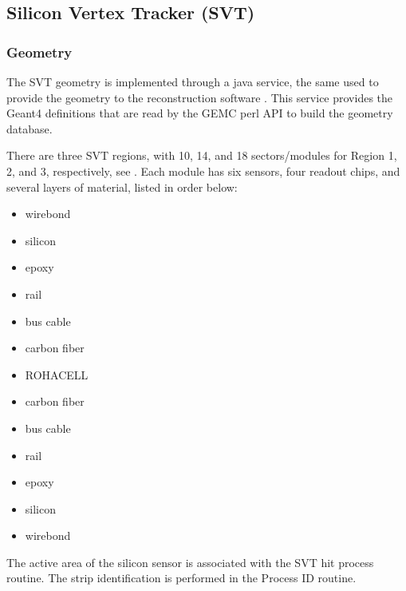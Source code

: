\subsection{Silicon Vertex Tracker (SVT)}


\subsubsection{Geometry}


The SVT \cite{svt-nim} geometry is implemented through a java service, the same used to provide the geometry
to the reconstruction software \cite{recon-nim}.
This service provides the Geant4 definitions that are read by the GEMC perl API to build the geometry database.

There are three SVT regions, with 10, 14, and 18 sectors/modules for Region 1, 2, and 3, respectively, see .
Each module has six sensors, four readout chips, and several layers of material, listed in order below:

\begin{itemize}
	\item wirebond
	\item silicon
	\item epoxy
	\item rail
	\item bus cable
	\item carbon fiber
	\item ROHACELL
	\item carbon fiber
	\item bus cable
	\item rail
	\item epoxy
	\item silicon
	\item wirebond
\end{itemize}

The active area of the silicon sensor is associated with the SVT hit process routine.
The strip identification is performed in the Process ID routine.

